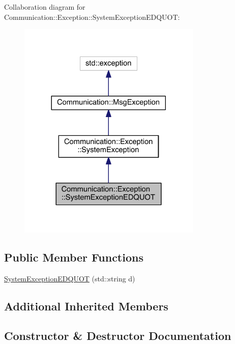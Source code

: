 Collaboration diagram for Communication\+:\+:Exception\+:\+:System\+Exception\+E\+D\+Q\+U\+O\+T\+:\nopagebreak
\begin{figure}[H]
\begin{center}
\leavevmode
\includegraphics[width=248pt]{class_communication_1_1_exception_1_1_system_exception_e_d_q_u_o_t__coll__graph}
\end{center}
\end{figure}
\subsection*{Public Member Functions}
\begin{DoxyCompactItemize}
\item 
\hyperlink{class_communication_1_1_exception_1_1_system_exception_e_d_q_u_o_t_a67890617c28d082d38dc1160be0dbcc0}{System\+Exception\+E\+D\+Q\+U\+O\+T} (std\+::string d)
\end{DoxyCompactItemize}
\subsection*{Additional Inherited Members}


\subsection{Constructor \& Destructor Documentation}
\hypertarget{class_communication_1_1_exception_1_1_system_exception_e_d_q_u_o_t_a67890617c28d082d38dc1160be0dbcc0}{}
